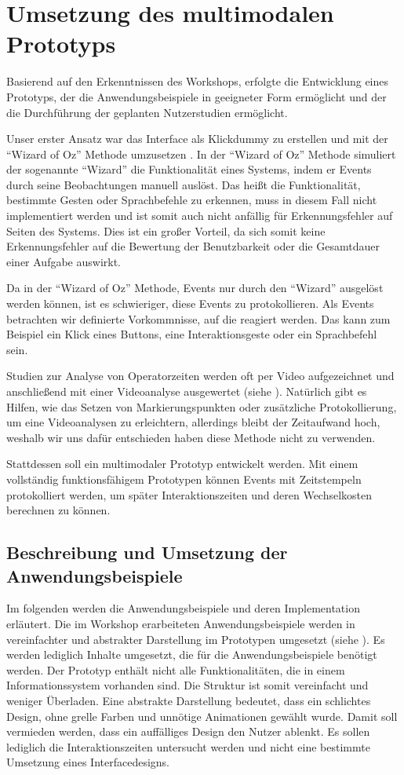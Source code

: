 \chapter[Multimodaler Prototyp]{Umsetzung des multimodalen Prototyps}\label{cha:Prototyp}
Basierend auf den Erkenntnissen des Workshops, erfolgte die Entwicklung eines Prototyps, der die Anwendungsbeispiele in geeigneter Form ermöglicht und der die Durchführung der geplanten Nutzerstudien ermöglicht.

Unser erster Ansatz war das Interface als Klickdummy zu erstellen und mit der "`Wizard of Oz"' Methode umzusetzen \citep{salber1993applying}. 
In der "`Wizard of Oz"' Methode simuliert der sogenannte "`Wizard"' die Funktionalität eines Systems, indem er Events durch seine Beobachtungen manuell auslöst. 
Das heißt die Funktionalität, bestimmte Gesten oder Sprachbefehle zu erkennen, muss in diesem Fall nicht implementiert werden und ist somit auch nicht anfällig für Erkennungsfehler auf Seiten des Systems. 
Dies ist ein großer Vorteil, da sich somit keine Erkennungsfehler auf die Bewertung der Benutzbarkeit oder die Gesamtdauer einer Aufgabe auswirkt.

Da in der "`Wizard of Oz"' Methode, Events nur durch den "`Wizard"' ausgelöst werden können, ist es schwieriger, diese Events zu protokollieren. Als Events betrachten wir definierte Vorkommnisse, auf die reagiert werden. 
Das kann zum Beispiel ein Klick eines Buttons, eine Interaktionsgeste oder ein Sprachbefehl sein.

Studien zur Analyse von Operatorzeiten werden oft per Video aufgezeichnet und anschließend mit einer Videoanalyse ausgewertet (siehe \citep{SchneegaB_2011, how2005optimizing}). 
Natürlich gibt es Hilfen, wie das Setzen von Markierungspunkten oder zusätzliche Protokollierung, um eine Videoanalysen zu erleichtern, allerdings bleibt der Zeitaufwand hoch, weshalb wir uns dafür entschieden haben diese Methode nicht zu verwenden. 

Stattdessen soll ein multimodaler Prototyp entwickelt werden. 
Mit einem vollständig funktionsfähigem Prototypen können Events mit Zeitstempeln protokolliert werden, um später Interaktionszeiten und deren Wechselkosten berechnen zu können. 
\clearpage
\section[Anwendungsbeispiele]{Beschreibung und Umsetzung der Anwendungsbeispiele}
Im folgenden werden die Anwendungsbeispiele und deren Implementation erläutert.
Die im Workshop erarbeiteten Anwendungsbeispiele werden in vereinfachter und abstrakter Darstellung im Prototypen umgesetzt (siehe ). 
Es werden lediglich Inhalte umgesetzt, die für die Anwendungsbeispiele benötigt werden. 
Der Prototyp enthält nicht alle Funktionalitäten, die in einem Informationssystem vorhanden sind. 
Die Struktur ist somit vereinfacht und weniger Überladen. 
Eine abstrakte Darstellung bedeutet, dass ein schlichtes Design, ohne grelle Farben und unnötige Animationen gewählt wurde.
Damit soll vermieden werden, dass ein auffälliges Design den Nutzer ablenkt. 
Es sollen lediglich die Interaktionszeiten untersucht werden und nicht eine bestimmte Umsetzung eines Interfacedesigns. 

